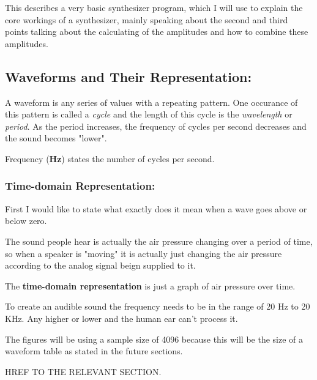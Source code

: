 \documentclass{article}
\begin{document}
This describes a very basic synthesizer program, which I will
use to explain the core workings of a synthesizer, mainly speaking
about the second and third points talking about the calculating of
the amplitudes and how to combine these amplitudes.

\subsection{Waveforms and Their Representation:}
A waveform is any series of values with a repeating pattern. One occurance 
of this pattern is called a \textit{cycle} and the length of this cycle is the 
\textit{wavelength} or \textit{period}. 
As the period increases, the frequency of cycles per second decreases and the 
sound becomes "lower".

\begin{cnote}
    Frequency (\textbf{Hz}) states the number of cycles per second.
\end{cnote}

\subsubsection{Time-domain Representation:}
First I would like to state what exactly does it mean when
a wave goes above or below zero.

The sound people hear is actually the air pressure changing
over a period of time, so when a speaker is "moving" it is 
actually just changing the air pressure according to the analog 
signal beign supplied to it.

The \textbf{time-domain representation} is just a graph of air pressure 
over time.

To create an audible sound the frequency needs to be in the 
range of 20 Hz to 20 KHz. Any higher or lower and the 
human ear can't process it.

\newpage

\begin{cnote}
    The figures will be using a sample size of 4096
    because this will be the size of a waveform table as stated 
    in the future sections.
\end{cnote}

\begin{cwarning}[TODO]
    HREF TO THE RELEVANT SECTION.
\end{cwarning}
\end{document}
